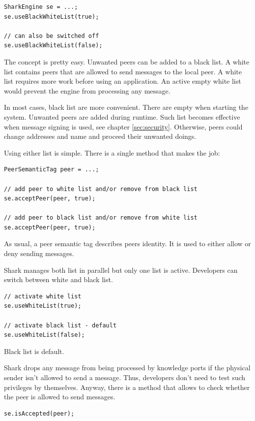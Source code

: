 \begin{verbatim}
SharkEngine se = ...;
se.useBlackWhiteList(true);

// can also be switched off
se.useBlackWhiteList(false);
\end{verbatim}

The concept is pretty easy. Unwanted peers can be added to a black list. A white list contains peers that are allowed to send messages to the local peer. A white list requires more work before using an application. An active empty white list would prevent the engine from processing any message. 

In most cases, black list are more convenient. There are empty when starting the system. Unwanted peers are added during runtime. Such list becomes effective when message signing is used, see chapter \ref{sec:security}. Otherwise, peers could change addresses and name and proceed their unwanted doings.

Using either list is simple. There is a single method that makes the job:
\begin{verbatim}
PeerSemanticTag peer = ...;

// add peer to white list and/or remove from black list
se.acceptPeer(peer, true);

// add peer to black list and/or remove from white list
se.acceptPeer(peer, true);
\end{verbatim}

As usual, a peer semantic tag describes peers identity. It is used
to either allow or deny sending messages.

Shark manages both list in parallel but only one list is active.
Developers can switch between white and black list.

\begin{verbatim}
// activate white list
se.useWhiteList(true);

// activate black list - default
se.useWhiteList(false);
\end{verbatim}

Black list is default.

Shark drops any message from being processed by knowledge ports if the physical sender isn't allowed to send a message. Thus, developers don't need to test such privileges by themselves. Anyway, there is a method that allows to check whether the peer is allowed to send messages.

\begin{verbatim}
se.isAccepted(peer);
\end{verbatim}


